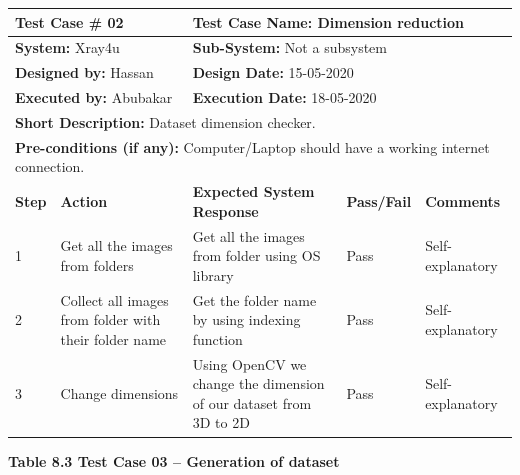 \documentclass{article} %
\begin{document}
\begin{tabular}{|p{0.4in}|p{1.1in}|p{1.4in}|p{0.5in}|p{0.8in}|} \hline 
\multicolumn{2}{|p{1in}|}{\textbf{Test Case \#} 02} & \multicolumn{3}{|p{2.7in}|}{\textbf{Test Case Name:} Dimension reduction} \\ \hline 
\multicolumn{2}{|p{1in}|}{\textbf{System:} Xray4u} & \multicolumn{3}{|p{2.7in}|}{\textbf{Sub-System: }Not a subsystem} \\ \hline 
\multicolumn{2}{|p{1in}|}{\textbf{Designed by:} Hassan} & \multicolumn{3}{|p{2.7in}|}{\textbf{Design Date:} 15-05-2020} \\ \hline 
\multicolumn{2}{|p{1in}|}{\textbf{Executed by:} Abubakar} & \multicolumn{3}{|p{2.7in}|}{\textbf{Execution Date:} 18-05-2020} \\ \hline 
\multicolumn{4}{|p{1in}|}{\textbf{Short Description:} Dataset dimension checker.} &  \\ \hline 
\multicolumn{5}{|p{1in}|}{\textbf{Pre-conditions (if any):} Computer/Laptop should have a working internet connection.} \\ \hline 
\textbf{Step} & \textbf{Action} & \textbf{Expected System Response} & \textbf{Pass/Fail} & \textbf{Comments} \\ \hline 
1 & Get all the images from folders & Get all the images from folder using OS library & Pass & Self-explanatory \\ \hline 
2 & Collect all images from folder with their folder name & Get the folder name by using indexing function & Pass & Self-explanatory \\ \hline 
3 & Change dimensions & Using OpenCV we change the dimension of our dataset from 3D to 2D & Pass & Self-explanatory \\ \hline 
\end{tabular}

\eject 

\noindent \textbf{Table 8.3 Test Case 03 -- Generation of dataset}
\end{document}
